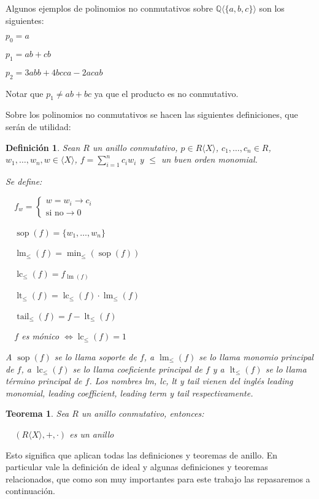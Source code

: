 \documentclass{amsbook}
\theoremstyle{customstyle}
\newtheorem{definition}{Definición}[section]
\newtheorem{theorem}{Teorema}[section]
\DeclareMathOperator{\sop}{sop}
\DeclareMathOperator{\lm}{lm}
\DeclareMathOperator{\lc}{lc}
\DeclareMathOperator{\lt}{lt}
\DeclareMathOperator{\tail}{tail}
\begin{document}
Algunos ejemplos de polinomios no conmutativos sobre $ℚ⟨\{a, b, c\}⟩$ son los siguientes:

$p_0 = a$

$p_1 = ab + cb$

$p_2 = 3 abb + 4 bcca - 2 acab$

Notar que $p_1 ≠ ab + bc$ ya que el producto es no conmutativo.

Sobre los polinomios no conmutativos se hacen las siguientes definiciones, que serán de utilidad:


\begin{definition}
Sean $R$ un anillo conmutativo, $p ∈ R⟨X⟩$, $c_1, …, c_n ∈ R$, $w_1, …, w_n, w ∈ ⟨X⟩$, $f = \sum_{i = 1}^n c_i w_i$ y $≤$ un buen orden monomial.

Se define:

  $f_w = \left\{\begin{array}{ll} w = w_i → c_i \\ \text{si no} → 0  \end{array} \right. $

  $\sop(f) = \{w_1, …, w_n\}$

  $\lm_≤(f) = \min_≤(\sop(f))$

  $\lc_≤(f) = f_{\lm(f)}$

  $\lt_≤(f) = \lc_≤(f) · \lm_≤(f)$

  $\tail_≤(f) = f - \lt_≤(f)$

  $f$ es mónico $⇔ \lc_≤(f) = 1$

A $\sop(f)$ se lo llama soporte de $f$, a $\lm_≤(f)$ se lo llama monomio principal de $f$, a $\lc_≤(f)$ se lo llama coeficiente principal de $f$ y a $\lt_≤(f)$ se lo llama término principal de $f$. Los nombres lm, lc, lt y tail vienen del inglés leading monomial, leading coefficient, leading term y tail respectivamente.

\end{definition}

\begin{theorem}
Sea $R$ un anillo conmutativo, entonces:

  $(R⟨X⟩, +, ·)$ es un anillo

\end{theorem}

Esto significa que aplican todas las definiciones y teoremas de anillo.
En particular vale la definición de ideal y algunas definiciones y teoremas relacionados, que como son muy importantes para este trabajo las repasaremos a continuación.
\end{document}
